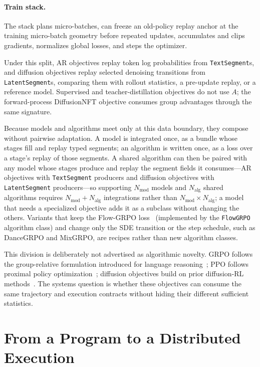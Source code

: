 \documentclass[10pt]{article}
\begin{document}
\paragraph{Train stack.}
The stack plans micro-batches, can freeze an old-policy replay anchor at the training micro-batch geometry before repeated updates, accumulates and clips gradients, normalizes global losses, and steps the optimizer.

Under this split, AR objectives replay token log probabilities from \texttt{TextSegment}s, and diffusion objectives replay selected denoising transitions from \texttt{LatentSegment}s, comparing them with rollout statistics, a pre-update replay, or a reference model.
Supervised and teacher-distillation objectives do not use $A$; the forward-process DiffusionNFT objective consumes group advantages through the same signature.

Because models and algorithms meet only at this data boundary, they compose without pairwise adaptation.
A model is integrated once, as a bundle whose stages fill and replay typed segments; an algorithm is written once, as a loss over a stage's replay of those segments.
A shared algorithm can then be paired with any model whose stages produce and replay the segment fields it consumes---AR objectives with \texttt{TextSegment} producers and diffusion objectives with \texttt{LatentSegment} producers---so supporting $N_{\mathrm{mod}}$ models and $N_{\mathrm{alg}}$ shared algorithms requires $N_{\mathrm{mod}}+N_{\mathrm{alg}}$ integrations rather than $N_{\mathrm{mod}}\times N_{\mathrm{alg}}$; a model that needs a specialized objective adds it as a subclass without changing the others.
Variants that keep the Flow-GRPO loss~\citep{liu2025flowgrpo} (implemented by the \texttt{FlowGRPO} algorithm class) and change only the SDE transition or the step schedule, such as DanceGRPO and MixGRPO, are recipes rather than new algorithm classes.

This division is deliberately not advertised as algorithmic novelty.
GRPO follows the group-relative formulation introduced for language reasoning~\citep{shao2024deepseekmath}; PPO follows proximal policy optimization~\citep{schulman2017ppo}; diffusion objectives build on prior diffusion-RL methods~\citep{black2023ddpo,liu2025flowgrpo,xue2025dancegrpo,zheng2025diffusionnft}.
The systems question is whether these objectives can consume the same trajectory and execution contracts without hiding their different sufficient statistics.

\section{From a Program to a Distributed Execution}
\label{sec:execution}
\end{document}
